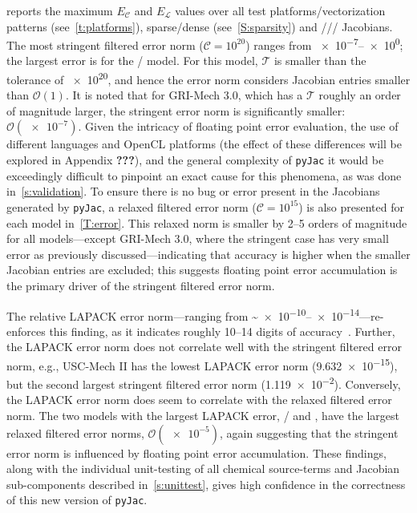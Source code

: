 \documentclass[12pt,number,sort&compress,preprint]{elsarticle}
\begin{document}
 reports the maximum $E_{\mathcal{C}}$ and $E_{\mathcal{L}}$ values over all test platforms\slash vectorization patterns (see~\cref{t:platforms}), sparse\slash dense (see~\cref{S:sparsity}) and \conp/\slash\conv/ Jacobians.
The most stringent filtered error norm ($\mathcal{C} = 10^{20}$) ranges from \numrange[retain-zero-exponent=true]{e-7}{e0}; the largest error is for the \slash{} model.
For this model, $\mathcal{T}$  is smaller than the tolerance of \num{e20}, and hence the error norm considers Jacobian entries smaller than $\mathcal{O}(1)$.
It is noted that for GRI-Mech 3.0, which has a $\mathcal{T}$ roughly an order of magnitude larger, the stringent error norm is significantly smaller: $\mathcal{O}(\num{e-7})$.
Given the intricacy of floating point error evaluation, the use of different languages and OpenCL platforms (the effect of these differences will be explored in Appendix \textbf{???}), and the general complexity of \texttt{pyJac} it would be exceedingly difficult to pinpoint an exact cause for this phenomena, as was done in~\cref{s:validation}.
To ensure there is no bug or error present in the Jacobians generated by \texttt{pyJac}, a relaxed filtered error norm ($\mathcal{C} = 10^{15}$) is also presented for each model in~\cref{T:error}.
This relaxed norm is smaller by \numrange{2}{5} orders of magnitude for all models---except GRI-Mech 3.0, where the stringent case has very small error as previously discussed---indicating that accuracy is higher when the smaller Jacobian entries are excluded; this suggests floating point error accumulation is the primary driver of the stringent filtered error norm.

The relative LAPACK error norm---ranging from \textasciitilde\numrange{e-10}{e-14}---re-enforces this finding, as it indicates roughly \numrange{10}{14} digits of accuracy~\cite{Anderson:1999aa}.
Further, the LAPACK error norm does not correlate well with the stringent filtered error norm, e.g., USC-Mech II has the lowest LAPACK error norm (\num{9.632e-15}), but the second largest stringent filtered error norm (\num{1.119e-2}).
Conversely, the LAPACK error norm does seem to correlate with the relaxed filtered error norm.
The two models with the largest LAPACK error, \slash{} and , have the largest relaxed filtered error norms, $\mathcal{O}(\num{e-5})$, again suggesting that the stringent error norm is influenced by floating point error accumulation.
These findings, along with the individual unit-testing of all chemical source-terms and Jacobian sub-components described in~\cref{s:unittest}, gives high confidence in the correctness of this new version of \texttt{pyJac}.
\end{document}
